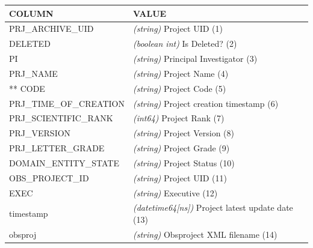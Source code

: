 \documentclass[a4paper,10pt,english]{sphinxmanual}
\begin{document}
\begin{tabulary}{\linewidth}{|L|L|}
\hline
\textsf{\relax 
COLUMN
} & \textsf{\relax 
VALUE
}\\
\hline
PRJ\_ARCHIVE\_UID
 & 
\emph{(string)} Project UID (1)
\\

DELETED
 & 
\emph{(boolean int)} Is Deleted? (2)
\\

PI
 & 
\emph{(string)} Principal Investigator (3)
\\

PRJ\_NAME
 & 
\emph{(string)} Project Name (4)
\\

** CODE
 & 
\emph{(string)} Project Code (5)
\\

PRJ\_TIME\_OF\_CREATION
 & 
\emph{(string)} Project creation timestamp (6)
\\

PRJ\_SCIENTIFIC\_RANK
 & 
\emph{(int64)} Project Rank (7)
\\

PRJ\_VERSION
 & 
\emph{(string)} Project Version (8)
\\

PRJ\_LETTER\_GRADE
 & 
\emph{(string)} Project Grade (9)
\\

DOMAIN\_ENTITY\_STATE
 & 
\emph{(string)} Project Status (10)
\\

OBS\_PROJECT\_ID
 & 
\emph{(string)} Project UID (11)
\\

EXEC
 & 
\emph{(string)} Executive (12)
\\

timestamp
 & 
\emph{(datetime64{[}ns{]})} Project latest update date (13)
\\

obsproj
 & 
\emph{(string)} Obsproject XML filename (14)
\\
\hline\end{tabulary}
\end{document}
